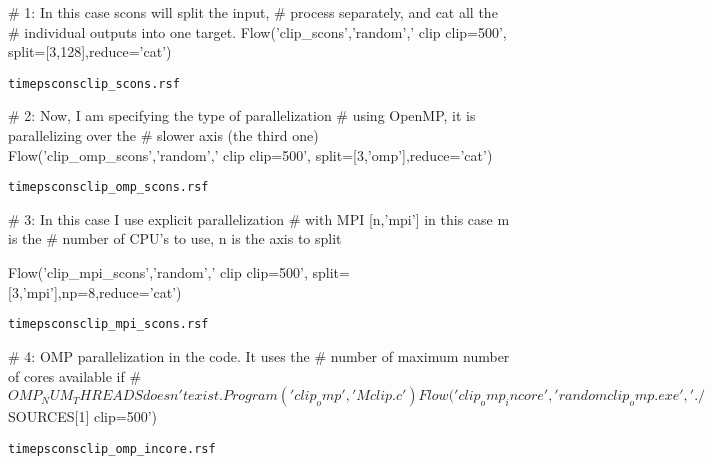 \begin{frame}[fragile]
\begin{python}
# 1: In this case scons will split the input,
#    process separately, and cat all the 
#    individual outputs into one target.  
Flow('clip_scons','random',' clip clip=500',
      split=[3,128],reduce='cat')
\end{python}

   \begin{alltt}
   time pscons clip_scons.rsf
   \end{alltt}
\end{frame}

\begin{frame}[fragile]
\begin{python}
# 2: Now, I am specifying the type of parallelization
#    using OpenMP, it is parallelizing over the
#    slower axis (the third one) 
Flow('clip_omp_scons','random',' clip clip=500',
    split=[3,'omp'],reduce='cat')
\end{python}

   \begin{alltt}
   time pscons clip_omp_scons.rsf
   \end{alltt}
\end{frame}



\begin{frame}[fragile]
\begin{python}
# 3: In this case I use explicit parallelization 
#    with MPI [n,'mpi'] in this case m is the
#    number of CPU's to use, n is the axis to split

Flow('clip_mpi_scons','random',' clip clip=500',
    split=[3,'mpi'],np=8,reduce='cat')
\end{python}
   \begin{alltt}
   time pscons clip_mpi_scons.rsf
   \end{alltt}
\end{frame}




\begin{frame}[fragile]
\begin{python}
# 4: OMP parallelization in the code. It uses the
#    number of maximum number of cores available if
#    $OMP_NUM_THREADS doesn't exist.
Program('clip_omp','Mclip.c')
Flow('clip_omp_incore','random clip_omp.exe',
     './${SOURCES[1]} clip=500')
\end{python}
   \begin{alltt}
   time pscons clip_omp_incore.rsf
   \end{alltt}
\end{frame}


